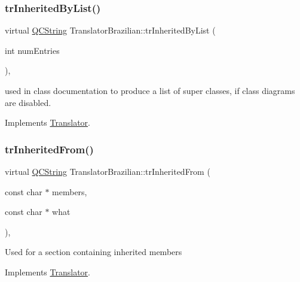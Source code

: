 \mbox{\label{class_translator_brazilian_a5d2344864dc9db2f5b01955fd59c8f0b}} 
\subsubsection{\texorpdfstring{trInheritedByList()}{trInheritedByList()}}
{\footnotesize\ttfamily virtual \mbox{\hyperlink{class_q_c_string}{Q\+C\+String}} Translator\+Brazilian\+::tr\+Inherited\+By\+List (\begin{DoxyParamCaption}\item[{int}]{num\+Entries }\end{DoxyParamCaption})\hspace{0.3cm}{\ttfamily [inline]}, {\ttfamily [virtual]}}

used in class documentation to produce a list of super classes, if class diagrams are disabled. 

Implements \mbox{\hyperlink{class_translator}{Translator}}.

\mbox{\label{class_translator_brazilian_a8508dc9763d85488ccbf7968af656c04}} 
\subsubsection{\texorpdfstring{trInheritedFrom()}{trInheritedFrom()}}
{\footnotesize\ttfamily virtual \mbox{\hyperlink{class_q_c_string}{Q\+C\+String}} Translator\+Brazilian\+::tr\+Inherited\+From (\begin{DoxyParamCaption}\item[{const char $\ast$}]{members,  }\item[{const char $\ast$}]{what }\end{DoxyParamCaption})\hspace{0.3cm}{\ttfamily [inline]}, {\ttfamily [virtual]}}

Used for a section containing inherited members 

Implements \mbox{\hyperlink{class_translator}{Translator}}.

\mbox{\label{class_translator_brazilian_aa280748d0dd16d382f52cb5d652792c8}} 

